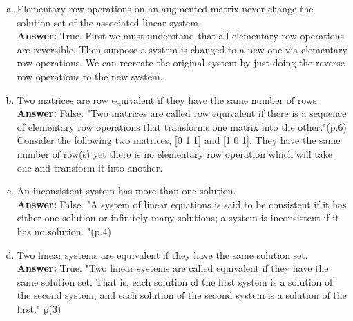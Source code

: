 \documentclass{amsart}
\begin{document}
\begin{enumerate}[(a)]
\item Elementary row operations on an augmented matrix never change the solution set of the associated linear system.\\

\noindent \textbf{Answer: }
True. First we must understand that all elementary row operations are reversible. Then suppose a system is changed to a new one via elementary row operations. We can recreate the original system by just doing the reverse row operations to the new system.


\vspace{1in}

\item Two matrices are row equivalent if they have the same number of rows\\

\noindent \textbf{Answer: }
False. "Two matrices are called row equivalent if there is a sequence of elementary row operations that transforms one matrix into the other."(p.6) Consider the following two matrices, [0 1 1] and [1 0 1]. They have the same number of row(s) yet there is no elementary row operation which will take one and transform it into another. 
\vspace{1in}

\item An inconsistent system has more than one solution. \\

\noindent \textbf{Answer: }
False. "A system of linear equations is said to be consistent if it has either one solution or infinitely many solutions; a system is inconsistent if it has no solution.
"(p.4)
\vspace{1in}

\item Two linear systems are equivalent if they have the same solution set. \\

\noindent \textbf{Answer: }
True. "Two linear systems are called equivalent if they have the same solution set. That is, each solution of the first system is a solution of the second system, and each solution of the second system is a solution of the first." p(3)
\vspace{1in}


\end{enumerate}
\end{document}
